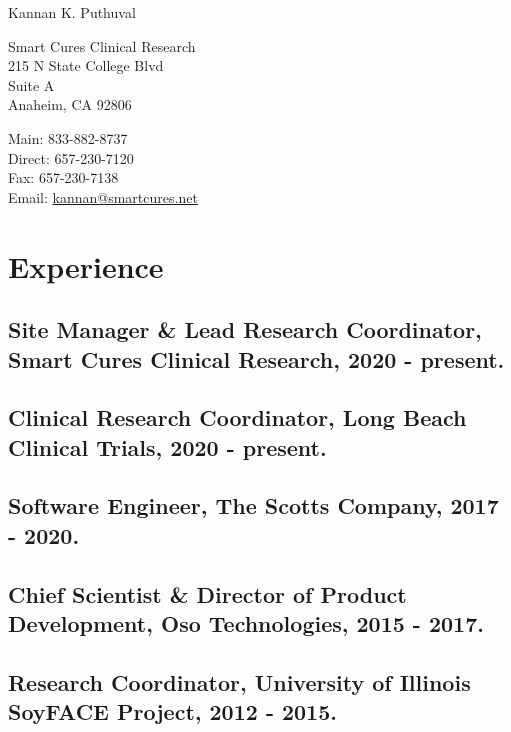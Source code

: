 \documentclass[letterpaper]{article}
\def\name{Kannan K. Puthuval}
\begin{document}
{\huge \name}


\vspace{0.25in}

\begin{minipage}{0.45\linewidth}
  Smart Cures Clinical Research \\
  215 N State College Blvd \\
  Suite A \\
  Anaheim, CA 92806 \\
\end{minipage}
\begin{minipage}{0.45\linewidth}
  Main: 833-882-8737 \\
  Direct: 657-230-7120 \\
  Fax: 657-230-7138 \\
  Email: \href{mailto:kannan@smartcures.net}{kannan@smartcures.net} \\
\end{minipage}

\section*{Experience}

  \subsection*{Site Manager \& Lead Research Coordinator, Smart Cures Clinical Research, 2020 - present.}

  \subsection*{Clinical Research Coordinator, Long Beach Clinical Trials, 2020 - present.}

  \subsection*{Software Engineer, The Scotts Company, 2017 - 2020.}

  \subsection*{Chief Scientist \& Director of Product Development, Oso Technologies, 2015 - 2017.}

  \subsection*{Research Coordinator, University of Illinois SoyFACE Project, 2012 - 2015.}
\end{document}
